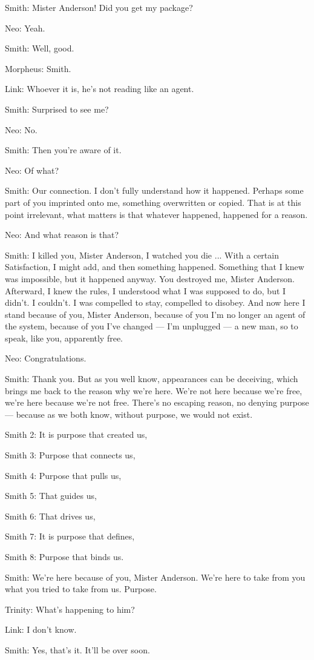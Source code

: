 \documentclass[UTF8]{ctexart}
\newenvironment{myquote}{\color{green} \setlength{\leftskip}{6em} \setlength{\rightskip}{4em} \setlength{\parindent}{-2em}}{\par}
\begin{document}
\begin{myquote}
Smith: Mister Anderson! Did you get my package?

Neo: Yeah.

Smith: Well, good.

Morpheus: Smith.

Link: Whoever it is, he's not reading like an agent.

Smith: Surprised to see me?

Neo: No.

Smith: Then you're aware of it.

Neo: Of what?

Smith: Our connection. I don't fully understand how it happened. Perhaps some part of you imprinted onto me, something overwritten or copied. That is at this point irrelevant, what matters is that whatever happened, happened for a reason.

Neo: And what reason is that?

Smith: I killed you, Mister Anderson, I watched you die ... With a certain Satisfaction, I might add, and then something happened. Something that I knew was impossible, but it happened anyway. You destroyed me, Mister Anderson. Afterward, I knew the rules, I understood what I was supposed to do, but I didn't. I couldn't. I was compelled to stay, compelled to disobey. And now here I stand because of you, Mister Anderson, because of you I'm no longer an agent of the system, because of you I've changed --- I'm unplugged --- a new man, so to speak, like you, apparently free.

Neo: Congratulations.

Smith: Thank you. But as you well know, appearances can be deceiving, which brings me back to the reason why we're here. We're not here because we're free, we're here because we're not free. There's no escaping reason, no denying purpose --- because as we both know, without purpose, we would not exist.

Smith 2: It is purpose that created us,

Smith 3: Purpose that connects us,

Smith 4: Purpose that pulls us,

Smith 5: That guides us,

Smith 6: That drives us,

Smith 7: It is purpose that defines,

Smith 8: Purpose that binds us.

Smith: We're here because of you, Mister Anderson. We're here to take from you what you tried to take from us. Purpose.

Trinity: What's happening to him?

Link: I don't know.

Smith: Yes, that's it. It'll be over soon.
\end{myquote}
\end{document}
